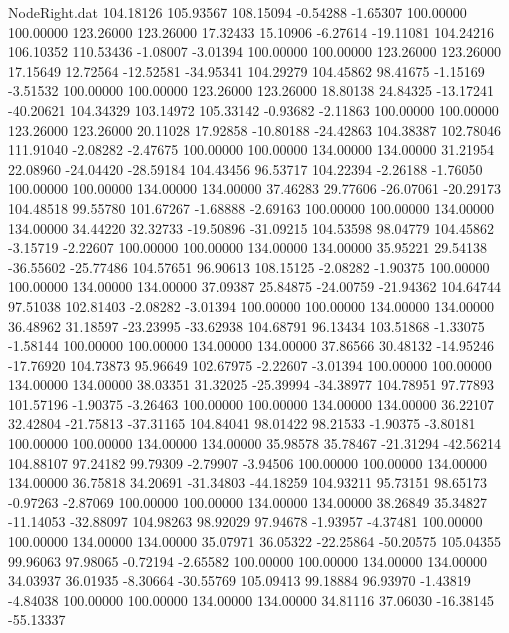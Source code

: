 \begin{filecontents}{NodeRight.dat}
 104.18126  105.93567  108.15094    -0.54288   -1.65307  100.00000  100.00000  123.26000  123.26000   17.32433   15.10906   -6.27614  -19.11081
 104.24216  106.10352  110.53436    -1.08007   -3.01394  100.00000  100.00000  123.26000  123.26000   17.15649   12.72564  -12.52581  -34.95341
 104.29279  104.45862   98.41675    -1.15169   -3.51532  100.00000  100.00000  123.26000  123.26000   18.80138   24.84325  -13.17241  -40.20621
 104.34329  103.14972  105.33142    -0.93682   -2.11863  100.00000  100.00000  123.26000  123.26000   20.11028   17.92858  -10.80188  -24.42863
 104.38387  102.78046  111.91040    -2.08282   -2.47675  100.00000  100.00000  134.00000  134.00000   31.21954   22.08960  -24.04420  -28.59184
 104.43456   96.53717  104.22394    -2.26188   -1.76050  100.00000  100.00000  134.00000  134.00000   37.46283   29.77606  -26.07061  -20.29173
 104.48518   99.55780  101.67267    -1.68888   -2.69163  100.00000  100.00000  134.00000  134.00000   34.44220   32.32733  -19.50896  -31.09215
 104.53598   98.04779  104.45862    -3.15719   -2.22607  100.00000  100.00000  134.00000  134.00000   35.95221   29.54138  -36.55602  -25.77486
 104.57651   96.90613  108.15125    -2.08282   -1.90375  100.00000  100.00000  134.00000  134.00000   37.09387   25.84875  -24.00759  -21.94362
 104.64744   97.51038  102.81403    -2.08282   -3.01394  100.00000  100.00000  134.00000  134.00000   36.48962   31.18597  -23.23995  -33.62938
 104.68791   96.13434  103.51868    -1.33075   -1.58144  100.00000  100.00000  134.00000  134.00000   37.86566   30.48132  -14.95246  -17.76920
 104.73873   95.96649  102.67975    -2.22607   -3.01394  100.00000  100.00000  134.00000  134.00000   38.03351   31.32025  -25.39994  -34.38977
 104.78951   97.77893  101.57196    -1.90375   -3.26463  100.00000  100.00000  134.00000  134.00000   36.22107   32.42804  -21.75813  -37.31165
 104.84041   98.01422   98.21533    -1.90375   -3.80181  100.00000  100.00000  134.00000  134.00000   35.98578   35.78467  -21.31294  -42.56214
 104.88107   97.24182   99.79309    -2.79907   -3.94506  100.00000  100.00000  134.00000  134.00000   36.75818   34.20691  -31.34803  -44.18259
 104.93211   95.73151   98.65173    -0.97263   -2.87069  100.00000  100.00000  134.00000  134.00000   38.26849   35.34827  -11.14053  -32.88097
 104.98263   98.92029   97.94678    -1.93957   -4.37481  100.00000  100.00000  134.00000  134.00000   35.07971   36.05322  -22.25864  -50.20575
 105.04355   99.96063   97.98065    -0.72194   -2.65582  100.00000  100.00000  134.00000  134.00000   34.03937   36.01935   -8.30664  -30.55769
 105.09413   99.18884   96.93970    -1.43819   -4.84038  100.00000  100.00000  134.00000  134.00000   34.81116   37.06030  -16.38145  -55.13337

\end{filecontents}
